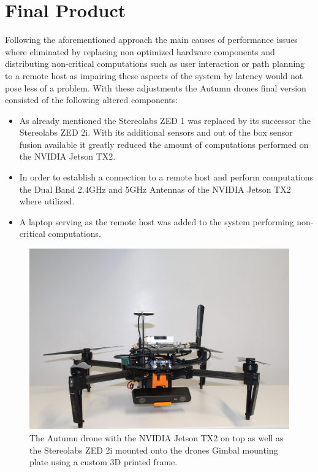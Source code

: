 \section{Final Product}
Following the aforementioned approach the main causes of performance issues where eliminated by replacing non optimized hardware components and distributing non-critical computations such as user interaction or path planning to a remote host as impairing these aspects of the system by latency would not pose less of a problem. 
With these adjustments the Autumn drones final version consisted of the following altered components:
\begin{itemize}
	\item As already mentioned the Stereolabs ZED 1 was replaced by its successor the Stereolabs ZED 2i. With its additional sensors and out of the box sensor fusion available it greatly reduced the amount of computations performed on the NVIDIA Jetson TX2. 
	\item In order to establish a connection to a remote host and perform computations the Dual Band 2.4GHz and 5GHz Antennas of the NVIDIA Jetson TX2 where utilized. 
	\item A laptop serving as the remote host was added to the system performing non-critical computations.
\end{itemize}

\begin{figure}
	\centering
	\includegraphics[width=0.9\linewidth]{img/autumnDrone}
	\caption{
		The Autumn drone with the NVIDIA Jetson TX2 on top as well as the Stereolabs ZED 2i mounted onto the drones Gimbal mounting plate using a custom 3D printed frame. 
	}
	\label{fig:autumn}
\end{figure}
\filbreak